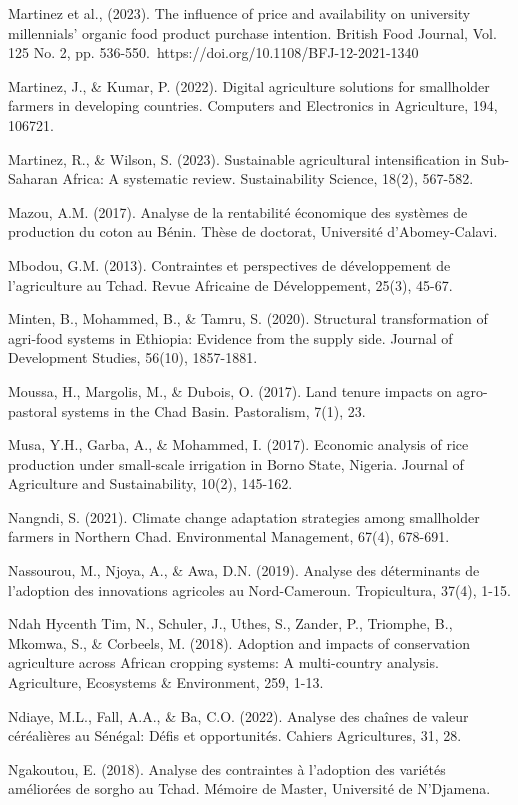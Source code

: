\documentclass[12pt,oneside]{report}
\begin{document}
Martinez et al., (2023). The influence of price and availability on university millennials’ organic food product purchase intention. British Food Journal, Vol. 125 No. 2, pp. 536-550. https://doi.org/10.1108/BFJ-12-2021-1340

Martinez, J., \& Kumar, P. (2022). Digital agriculture solutions for smallholder farmers in developing countries. Computers and Electronics in Agriculture, 194, 106721.

Martinez, R., \& Wilson, S. (2023). Sustainable agricultural intensification in Sub-Saharan Africa: A systematic review. Sustainability Science, 18(2), 567-582.

Mazou, A.M. (2017). Analyse de la rentabilité économique des systèmes de production du coton au Bénin. Thèse de doctorat, Université d'Abomey-Calavi.

Mbodou, G.M. (2013). Contraintes et perspectives de développement de l'agriculture au Tchad. Revue Africaine de Développement, 25(3), 45-67.

Minten, B., Mohammed, B., \& Tamru, S. (2020). Structural transformation of agri-food systems in Ethiopia: Evidence from the supply side. Journal of Development Studies, 56(10), 1857-1881.

Moussa, H., Margolis, M., \& Dubois, O. (2017). Land tenure impacts on agro-pastoral systems in the Chad Basin. Pastoralism, 7(1), 23.

Musa, Y.H., Garba, A., \& Mohammed, I. (2017). Economic analysis of rice production under small-scale irrigation in Borno State, Nigeria. Journal of Agriculture and Sustainability, 10(2), 145-162.

Nangndi, S. (2021). Climate change adaptation strategies among smallholder farmers in Northern Chad. Environmental Management, 67(4), 678-691.

Nassourou, M., Njoya, A., \& Awa, D.N. (2019). Analyse des déterminants de l'adoption des innovations agricoles au Nord-Cameroun. Tropicultura, 37(4), 1-15.

Ndah Hycenth Tim, N., Schuler, J., Uthes, S., Zander, P., Triomphe, B., Mkomwa, S., \& Corbeels, M. (2018). Adoption and impacts of conservation agriculture across African cropping systems: A multi-country analysis. Agriculture, Ecosystems \& Environment, 259, 1-13.

Ndiaye, M.L., Fall, A.A., \& Ba, C.O. (2022). Analyse des chaînes de valeur céréalières au Sénégal: Défis et opportunités. Cahiers Agricultures, 31, 28.

Ngakoutou, E. (2018). Analyse des contraintes à l'adoption des variétés améliorées de sorgho au Tchad. Mémoire de Master, Université de N'Djamena.
\end{document}
